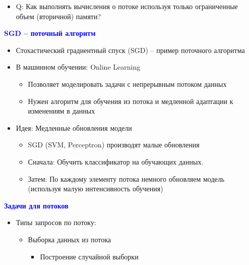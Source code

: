 \documentclass[landscape]{slides}
\begin{document}
\begin{normalsize}
\begin{slide}
\begin{itemize}
\item Q: Как выполнять вычисления о потоке используя только ограниченные объем (вторичной) памяти?
\end{itemize}
\end{slide}


\begin{slide}
\textbf{\textcolor{blue}{SGD – поточный алгоритм}}

\begin{itemize}
\item Стохастический градиентный спуск (SGD) – пример поточного алгоритма

\item В машинном обучении: Online Learning

  \begin{itemize}
  \item Позволяет моделировать задачи с непрерывным потоком данных 

  \item Нужен алгоритм для обучения из потока и медленной адаптации к изменениям в данных
  \end{itemize}

\item Идея: Медленные обновления модели

  \begin{itemize}
  \item SGD (SVM, Perceptron) производят малые обновления

  \item Сначала: Обучить классификатор на обучающих данных. 

  \item Затем: По каждому элементу потока немного обновляем модель (используя малую интенсивность обучения)
  \end{itemize}
\end{itemize}
\end{slide}


\begin{slide}
\textbf{\textcolor{blue}{Задачи для потоков}}

\begin{itemize}
\item Типы запросов по потоку:

  \begin{itemize}
  \item Выборка данных из потока

    \begin{itemize}
    \item Построение случайной выборки
    \end{itemize}


\end{itemize}
\end{itemize}
\end{slide}
\end{normalsize}
\end{document}
